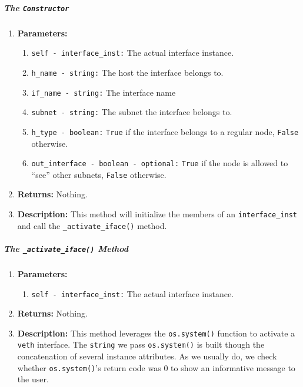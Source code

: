         \subparagraph{The \texttt{Constructor}}
            \begin{enumerate}
                \item \textbf{Parameters:}
                \begin{enumerate}
                    \item \texttt{self - interface\_inst:} The actual interface instance.
                    \item \texttt{h\_name - string:} The host the interface belongs to.
                    \item \texttt{if\_name - string:} The interface name
                    \item \texttt{subnet - string:} The subnet the interface belongs to.
                    \item \texttt{h\_type - boolean:} \texttt{True} if the interface belongs to a regular node, \texttt{False} otherwise.
                    \item \texttt{out\_interface - boolean - optional:} \texttt{True} if the node is allowed to ``see'' other subnets, \texttt{False} otherwise.
                \end{enumerate}
                \item \textbf{Returns:} Nothing.
                \item \textbf{Description:} This method will initialize the members of an \texttt{interface\_inst} and call the \texttt{\_activate\_iface()} method.
            \end{enumerate}

        \subparagraph{The \texttt{\_activate\_iface()} Method}
            \begin{enumerate}
                \item \textbf{Parameters:}
                \begin{enumerate}
                    \item \texttt{self - interface\_inst:} The actual interface instance.
                \end{enumerate}
                \item \textbf{Returns:} Nothing.
                \item \textbf{Description:} This method leverages the \texttt{os.system()} function to activate a \texttt{veth} interface. The \texttt{string} we pass \texttt{os.system()} is built though the concatenation of several instance attributes. As we usually do, we check whether \texttt{os.system()}'s return code was $0$ to show an informative message to the user.
            \end{enumerate}

